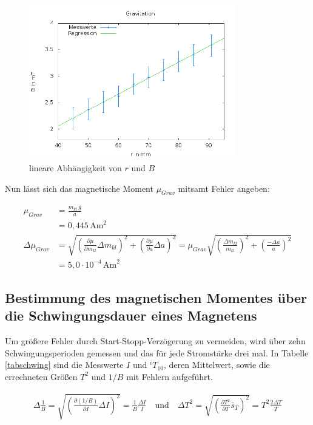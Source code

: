 \begin{figure}[H]
\includegraphics[width=0.8\textwidth] {pics/Gravitation.png}
\centering
\caption{lineare Abhängigkeit von $r$ und $B$}
\label{picgrav}
\end{figure}

Nun lässt sich das magnetische Moment $\mu_{Grav}$ mitsamt Fehler angeben:

\begin{align}
 \nonumber
 \mu_{Grav} &= \frac{m_{kl}\,g}{a} \\
 &= 0,445\, \text{Am}^2\\
 \nonumber
 \Delta \mu_{Grav} &= \sqrt{\left(\frac{\partial \mu}{\partial m_{kl}}\Delta m_{kl} \right)^2 + \left(\frac{\partial \mu}{\partial a}\Delta a \right)^2} = \mu_{Grav} \sqrt{\left( \frac{\Delta m_{kl}}{m_{kl}}\right)^2 + \left( \frac{-\Delta a}{a}\right)^2}\\
 &= 5,0 \cdot 10^{-4}\, \text{Am}^2
\end{align}

\subsection[Ermittlung durch Schwingungsdauer]{Bestimmung des magnetischen Momentes über die Schwingungsdauer eines Magnetens}
Um größere Fehler durch Start-Stopp-Verzögerung zu vermeiden, wird über zehn Schwingungsperioden gemessen und das für jede Stromstärke
drei mal. In Tabelle \ref{tabschwing} sind die Messwerte $I$ und $^iT_{10}$, deren Mittelwert, sowie die errechneten Größen $T^2$ und $1/B$
mit Fehlern aufgeführt.

\begin{align}
 \Delta \frac1B = \sqrt{\left(\frac{\partial (1/B)}{\partial I}\Delta I \right)^2} = \frac1B \frac{\Delta I}{I} \quad \text{und} \quad \Delta T^2 = \sqrt{\left(\frac{\partial T^2}{\partial T}\bar s_T\right)^2} = T^2\frac{2\Delta T}{T}
\end{align}


